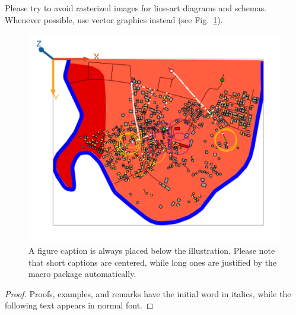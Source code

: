 \documentclass[runningheads]{llncs}
\begin{document}



Please try to avoid rasterized images for line-art diagrams and
schemas. Whenever possible, use vector graphics instead (see
Fig.~\ref{fig1}).

\begin{figure}
\includegraphics[width=\textwidth]{evacuationFullcap.png}
\caption{A figure caption is always placed below the illustration.
Please note that short captions are centered, while long ones are
justified by the macro package automatically.} \label{fig1}
\end{figure}


%
%

\begin{proof}
Proofs, examples, and remarks have the initial word in italics,
while the following text appears in normal font.
\end{proof}

%
%
% 
% 


  
\end{document}
